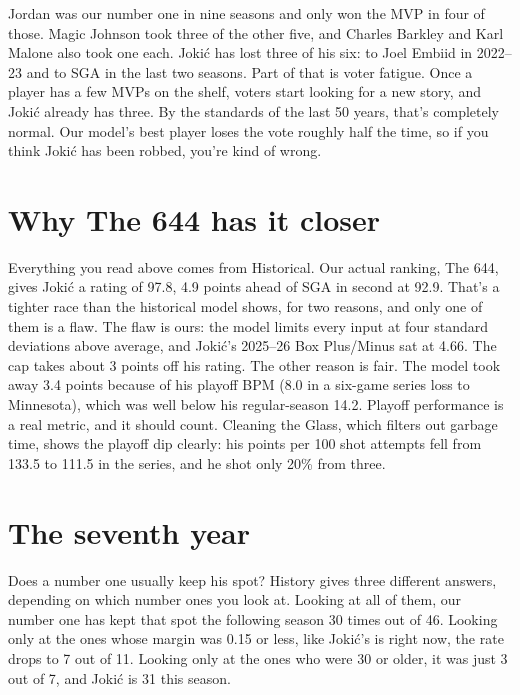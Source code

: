 \documentclass[11pt]{article}
\begin{document}
Jordan was our number one in nine seasons and only won the MVP in four of those. Magic
Johnson took three of the other five, and Charles Barkley and Karl Malone also took one each.
Jokić has lost three of his six: to Joel Embiid in 2022--23 and to SGA in the last two
seasons. Part of that
is voter fatigue. Once a player has a few MVPs on the shelf, voters start looking for a new
story, and Jokić already has three. By the standards of the last 50 years, that's completely
normal. Our model's best player loses the vote roughly half the time, so if you think Jokić
has been robbed, you're kind of wrong.

\section*{Why The 644 has it closer}

Everything you read above comes from \gravity{} Historical. Our actual ranking, The 644,
gives Jokić a rating of 97.8, 4.9 points ahead of SGA in second at
92.9. That's a tighter race
than the historical model shows, for two reasons, and only one of them is a flaw. The flaw is
ours: the model limits every input at four standard deviations above average, and Jokić's
2025--26 Box Plus/Minus sat at 4.66. The cap takes about 3 points off his
rating. The other reason is fair. The model
took away 3.4 points because of his playoff BPM (8.0 in a six-game series loss to Minnesota),
which was well below his regular-season 14.2. Playoff performance is a real metric, and it
should count. Cleaning the Glass, which filters out garbage time, shows the playoff dip
clearly: his points per 100 shot attempts fell from 133.5 to 111.5 in the series, and he shot
only 20\% from three.

\section*{The seventh year}

Does a number one usually keep his spot? History gives three different answers, depending on
which number ones you look at. Looking at all of them, our number one has kept that spot the
following season 30 times out of 46. Looking only at the ones whose margin was 0.15 or less,
like Jokić's is right now, the rate drops to 7 out of 11. Looking only at the ones who were 30
or older, it was just 3 out of 7, and Jokić is 31 this season.
\end{document}
